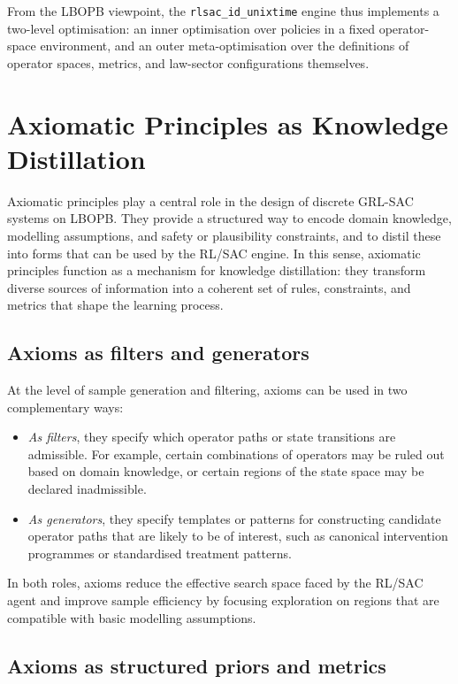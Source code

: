 \documentclass[11pt]{book}
\theoremstyle{plain}
\theoremstyle{definition}
\theoremstyle{remark}
\begin{document}
From the LBOPB viewpoint, the \texttt{rlsac\_id\_unixtime} engine thus
implements a two-level optimisation: an inner optimisation over
policies in a fixed operator-space environment, and an outer
meta-optimisation over the definitions of operator spaces, metrics,
and law-sector configurations themselves.

\section{Axiomatic Principles as Knowledge Distillation}


Axiomatic principles play a central role in the design of discrete
GRL-SAC systems on LBOPB. They provide a structured way to encode
domain knowledge, modelling assumptions, and safety or plausibility
constraints, and to distil these into forms that can be used by the
RL/SAC engine. In this sense, axiomatic principles function as a
mechanism for knowledge distillation: they transform diverse sources
of information into a coherent set of rules, constraints, and metrics
that shape the learning process.

\subsection*{Axioms as filters and generators}

At the level of sample generation and filtering, axioms can be used
in two complementary ways:

\begin{itemize}
  \item \emph{As filters}, they specify which operator paths or
        state transitions are admissible. For example, certain
        combinations of operators may be ruled out based on
        domain knowledge, or certain regions of the state space may
        be declared inadmissible.
  \item \emph{As generators}, they specify templates or patterns for
        constructing candidate operator paths that are likely to be
        of interest, such as canonical intervention programmes or
        standardised treatment patterns.
\end{itemize}

In both roles, axioms reduce the effective search space faced by the
RL/SAC agent and improve sample efficiency by focusing exploration on
regions that are compatible with basic modelling assumptions.

\subsection*{Axioms as structured priors and metrics}
\end{document}
